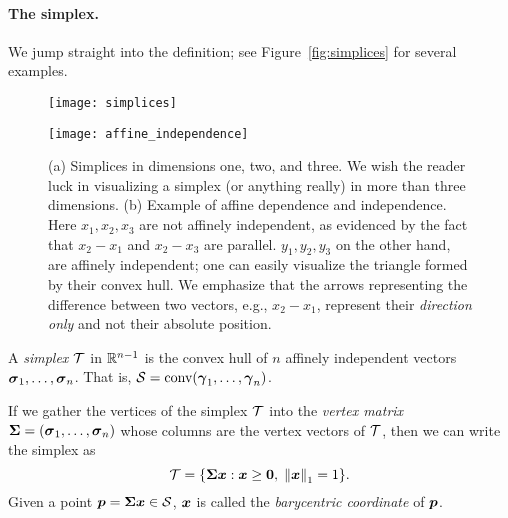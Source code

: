 \paragraph{The simplex.} 
We jump straight into the definition; see Figure~\ref{fig:simplices} for several examples. 
\begin{figure}
	\centering
	\begin{minipage}{0.45\textwidth}
		\texttt{[image: simplices]}
		\subcaption{}
		\label{fig:simplices}
	\end{minipage}
	\hspace{0.08\textwidth}
	\begin{minipage}{0.45\textwidth}
		\flushright
		\texttt{[image: affine\_independence]}
		\subcaption{}
		\label{fig:affine_independence}
	\end{minipage}
	\caption{(a) Simplices in dimensions one, two, and three. We wish the reader luck in visualizing a simplex (or anything really) in more than three dimensions. (b) Example of affine dependence and independence.  Here $x_1,x_2,x_3$ are not affinely independent, as evidenced by the fact that $x_2-x_1$ and $x_2-x_3$ are parallel. $y_1,y_2,y_3$ on the other hand, are affinely independent; one can easily visualize the triangle formed by their convex hull. We emphasize that the arrows representing the difference between two vectors, e.g., $x_2-x_1$, represent their \emph{direction only} and  not their absolute position.} 
	\label{fig:simplex+independence}
\end{figure}


\begin{definition}
\label{def:simplex}
A \emph{simplex} $\mathcal{T}$ in $\mathbb{R}^{n-1}$ is the convex hull of $n$ affinely independent vectors $\vb*{\sigma}_1,\dots,\vb*{\sigma}_n$. That is, $\mathcal{S}=\textnormal{conv}(\vb*{\gamma}_1,\dots,\vb*{\gamma}_n)$.  
\end{definition}

If we gather the vertices of the simplex $\mathcal{T}$ into the \emph{vertex matrix} $\boldsymbol{\Sigma}=(\vb*{\sigma}_1,\dots,\vb*{\sigma}_n)$ whose columns are the vertex vectors of $\mathcal{T}$, then we can write the simplex as 
\begin{equation*}
    \mathcal{T} = \{\boldsymbol{\Sigma} \vb*{x}:\vb*{x}\geq \vb{0}, \; \norm{\vb*{x}}_1=1\}.
\end{equation*}
Given a point $\vb*{p}=\boldsymbol{\Sigma}\vb*{x}\in\mathcal{S}$, $\vb*{x}$ is called the \emph{barycentric coordinate} of $\vb*{p}$.  

